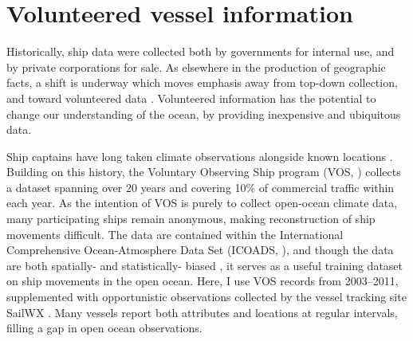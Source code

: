 \section{Volunteered vessel information}


Historically, ship data were collected both by governments for internal use, and by private corporations for sale. As elsewhere in the production of geographic facts, a shift is underway which moves emphasis away from top-down collection, and toward volunteered data \citep{goodchild2007citizens,elwood2011researching}. Volunteered information has the potential to change our understanding of the ocean, by providing inexpensive and ubiquitous data.

Ship captains have long taken climate observations alongside known locations \citep{brohan2009marine}.  Building on this history, the Voluntary Observing Ship program (VOS, \citealp{VOSOverview}) collects a dataset spanning over 20 years and covering 10\% of commercial traffic within each year. As the intention of VOS is purely to collect open-ocean climate data, many participating ships remain anonymous, making reconstruction of ship movements difficult.  The data are contained within the International Comprehensive Ocean-Atmosphere Data Set (ICOADS, \citealp{woodruff2010icoads}), and though the data are both spatially- and statistically- biased \citep{Wang2007}, it serves as a useful training dataset on ship movements in the open ocean. Here, I use VOS records from 2003--2011, supplemented with opportunistic observations collected by the vessel tracking site SailWX \citep{SAILWX}. Many vessels report both attributes and locations at regular intervals, filling a gap in open ocean observations.

